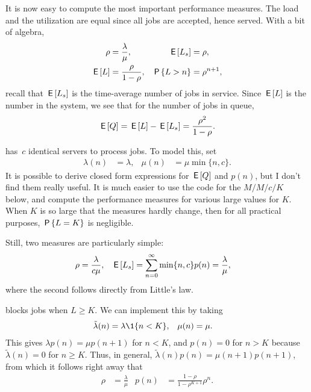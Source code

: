 \documentclass[stochastic-or.tex]{subfiles}
\begin{document}
It is now easy to compute the most important performance measures.
The load and the utilization are equal since all jobs are accepted, hence served.  With a bit of algebra,
\begin{align}\label{eq:el}
\rho &= \frac{\lambda}{\mu}, & \E{\Ls} &= \rho, \\
  \E \L &= \frac \rho{1-\rho}, & \P{\L> n} &= \rho^{n+1},
\end{align}
recall that $\E\Ls$ is the time-average number of jobs in service. Since $\E\L$ is the number in the system, we see that for the number of jobs in queue,
\begin{equation*}
\E \QQ = \E \L - \E{\Ls} = \frac{\rho^2}{1-\rho}.
\end{equation*}



 has~$c$ identical servers to process jobs.
To model this, set
\begin{align*}
\lambda(n) &= \lambda, & \mu(n) &= \mu \min\{n, c\}.
\end{align*}
It is possible to derive closed form expressions for $\E \QQ$ and $p(n)$, but I don't find them really useful.
It is much easier to use the code for the $M/M/c/K$ below, and compute the performance measures for various large values for $K$.
When $K$ is so large that the measures hardly change, then for all practical purposes, $\P{L=K}$ is negligible.

Still, two measures are particularly simple:
\begin{align*}
  \rho & = \frac{\lambda}{ c\mu}, & \E{\Ls} &= \sum_{n=0}^{\infty}\min\{n,c\} p(n)= \frac{\lambda}\mu,
\end{align*}
where the second follows directly from Little's law.



 blocks jobs when $L\geq K$.
We can implement this by taking
\begin{align*}
\tilde \lambda(n) &= \lambda \1{n < K}, & \mu(n) &= \mu.
\end{align*}
This gives $\lambda p(n) = \mu p(n+1)$ for $n<K$, and $p(n) = 0$ for $n>K$ because $\tilde \lambda(n) = 0$ for $n\geq K$.
Thus, in general, $\tilde \lambda(n) p(n) = \mu(n+1)p(n+1)$, from which it follows right away that
 \begin{align*}
\rho &= \frac{\lambda}{\mu} & p(n) &= \frac{1-\rho}{1-\rho^{K+1}} \rho^n.
\end{align*}
\end{document}
